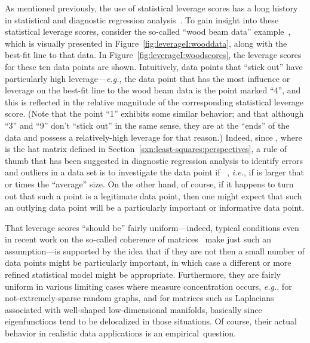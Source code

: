 \documentclass[twoside]{article}
\begin{document}
As mentioned previously, the use of statistical leverage scores has a long
history in statistical and diagnostic regression 
analysis~\cite{HW78,ChatterjeeHadi88,CH86,VW81,ChatterjeeHadiPrice00}. 
To gain insight into these statistical leverage scores, consider the 
so-called ``wood beam data'' example~\cite{DS66,HW78}, which is visually 
presented in Figure~\ref{fig:leverageI:wooddata}, along with the best-fit 
line to that data. 
In Figure~\ref{fig:leverageI:woodscores}, the leverage scores for these ten 
data points are shown.
Intuitively, data points that ``stick out'' have particularly high 
leverage---\emph{e.g.}, the data point that has the most influence or 
leverage on the best-fit line to the wood beam data is the point marked 
``4'', and this is reflected in the relative magnitude of the corresponding 
statistical leverage score.
(Note that the point ``1'' exhibits some similar behavior; and that although 
``3'' and ``9'' don't ``stick out'' in the same sense, they are at the 
``ends'' of the data and possess a relatively-high leverage for that reason.)
Indeed, since , where  is the hat matrix defined in 
Section~\ref{sxn:least-squares:perspectives}, 
a rule of thumb that has been suggested in
diagnostic regression analysis to identify errors and outliers in a data 
set is to investigate the  data point if 
~\cite{VW81,ChatterjeeHadiPrice00}, 
\emph{i.e.}, if  is larger that  or  times the ``average'' 
size.
On the other hand, of course, if it happens to turn out that such a point is 
a legitimate data point, 
then one might expect that such an outlying data point will be a 
particularly important or informative data point.

That leverage scores ``should be'' fairly uniform---indeed, typical 
conditions even in recent work on the so-called coherence of 
matrices~\cite{CR07,CSPW11,AMT10,TalRos10} make just such an 
assumption---is supported by the idea that if they are not then a small 
number of data points might be particularly important, in which case a 
different or more refined statistical model might be appropriate.
Furthermore, they are fairly uniform in various limiting cases where 
measure concentration occurs, \emph{e.g.}, for not-extremely-sparse 
random graphs, and for matrices such as Laplacians associated with 
well-shaped low-dimensional manifolds, basically since eigenfunctions tend 
to be delocalized in those situations.
Of course, their actual behavior in realistic data applications is an 
empirical~question.
\end{document}
